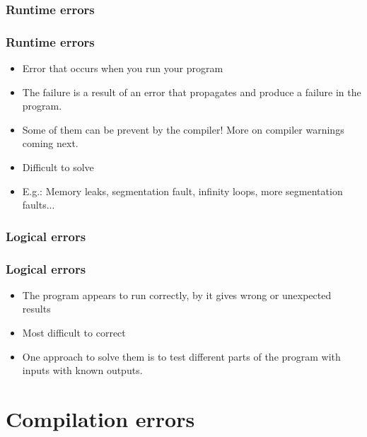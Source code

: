 \documentclass[t]{myBeamer}
\begin{document}
\subsubsection{Runtime errors} 

\begin{frame}[t]
\frametitle{ \huge Runtime errors}
\Large
\begin{itemize}
  \item Error that occurs when you run your program
  \item The failure is a result of an error that propagates and produce a failure in the program.
  \item Some of them can be prevent by the compiler! More on compiler warnings coming next.
  \item Difficult to solve
  \item E.g.: Memory leaks, segmentation fault, infinity loops, more segmentation faults...
\end{itemize}
\end{frame}

\subsubsection{Logical errors} 
\begin{frame}[t]
\frametitle{ \huge Logical errors}
\Large
\begin{itemize}
  \item The program appears to run correctly, by it gives wrong or unexpected results
  \item Most difficult to correct
  \item One approach to solve them is to test different parts of the program with inputs with known outputs.
\end{itemize}
\end{frame}



\section{Compilation errors} 
\end{document}
